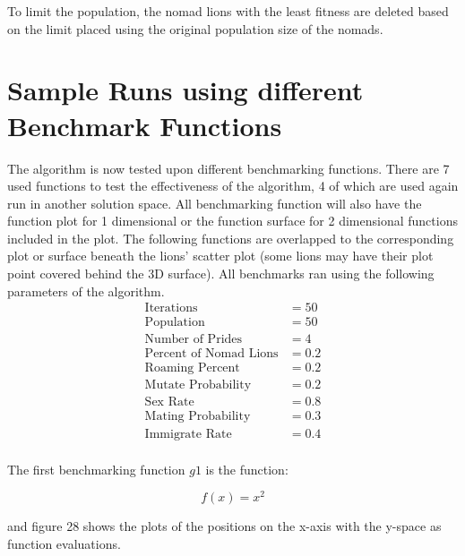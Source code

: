 \par To limit the population, the nomad lions with the least fitness are deleted based on the limit placed using the original population size of the nomads.

\section{Sample Runs using different Benchmark Functions}
\par The algorithm is now tested upon different benchmarking functions. There are 7 used functions to test the effectiveness of the algorithm, 4 of which are used again run in another solution space. All benchmarking function will also have the function plot for 1 dimensional or the function surface for 2 dimensional functions included in the plot. The following functions are overlapped to the corresponding plot or surface beneath the lions' scatter plot (some lions may have their plot point covered behind the 3D surface). All benchmarks ran using the following parameters of the algorithm.
\begin{align*}
\text{Iterations} &= 50\\
\text{Population} &= 50\\
\text{Number of Prides} &= 4\\
\text{Percent of Nomad Lions} &= 0.2\\
\text{Roaming Percent} &= 0.2\\
\text{Mutate Probability} &= 0.2\\
\text{Sex Rate} &= 0.8\\
\text{Mating Probability} &= 0.3\\
\text{Immigrate Rate} &= 0.4\\
\end{align*}
\par The first benchmarking function $g1$ is the function:

$$
  f(x) = x^2
$$

and figure 28 shows the plots of the positions on the x-axis with the y-space as function evaluations.

